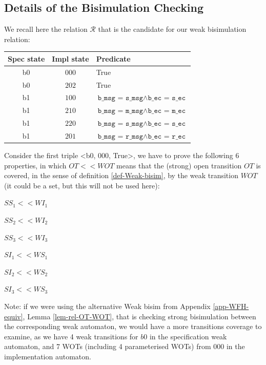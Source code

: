 \documentclass{lmcs}
\begin{document}
        \subsection{Details of the Bisimulation Checking}
         
We recall here the relation $\mathcal{R}$ that is the candidate for our weak bisimulation relation:

\bigskip
  \begin{tabular}{|c|c|l|}
\hline
    Spec state & Impl state & Predicate\\
    \hline
    b0 & $000$ & True\\
    b0 & $202$ & True\\
    b1 & $100$ & $\texttt{b\_msg = s\_msg} \land \texttt{b\_ec = s\_ec}$\\
    b1 & $210$ & $\texttt{b\_msg = m\_msg} \land \texttt{b\_ec = m\_ec}$\\
    b1 & $220$ & $\texttt{b\_msg = s\_msg} \land \texttt{b\_ec = s\_ec}$\\
    b1 & $201$ & $\texttt{b\_msg = r\_msg} \land \texttt{b\_ec = r\_ec}$\\
    \hline
    \end{tabular}


\bigskip
Consider the first triple <b0, 000, True>, we have to prove the following 6 properties, in which $OT<<WOT$ means that the (strong) open transition $OT$ is covered, in the sense
of definition \ref{def-Weak-bisim}, by the weak transition $WOT$ (it could be a set, but this will not be used here):

\bigskip
\begin{minipage}{0.2\linewidth} 	 
$SS_1 << WI_1$

$SS_2 << WI_2$

$SS_3 << WI_3$
\end{minipage}
\hspace{1cm}
\begin{minipage}{0.4\linewidth}
$SI_1 << WS_1$

$SI_2 << WS_2$

$SI_3 << WS_3$
\end{minipage}




\bigskip

         
         Note: if we were using the alternative Weak bisim from Appendix \ref{app-WFH-equiv}, Lemma \ref{lem-rel-OT-WOT}, that is checking strong bisimulation between the corresponding 
weak automaton, we would have a more transitions coverage to examine, as we have 4 weak transitions for $b0$ in the specification weak automaton, and 7 WOTs (including 4 
parameterised WOTs) from 000 in the implementation automaton.
         
\end{document}
